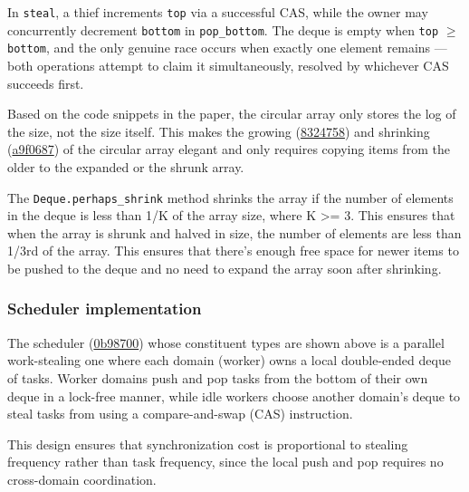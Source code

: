 \documentclass[11pt,a4paper]{article}
\begin{document}
In \texttt{steal}, a thief increments \texttt{top} via a successful CAS,
while the owner may concurrently decrement \texttt{bottom} in
\texttt{pop\_bottom}. The deque is empty when \texttt{top} $\geq$
\texttt{bottom}, and the only genuine race occurs when exactly one element
remains — both operations attempt to claim it simultaneously, resolved by
whichever CAS succeeds first.

Based on the code snippets in the \cite{chase2005dynamic} paper, the circular
array only stores the log of the size, not the size itself. This makes the growing
(\href{https://github.com/alinab/fork-cs6868_s26/commit/8324758fc3e51c064bcb5e6a216e97d5cc356c15}{8324758})
and shrinking
(\href{https://github.com/alinab/fork-cs6868_s26/commit/a9f0687fc8eb0b61dc2f059683f209be6a223649}{a9f0687})
of the circular array elegant and only requires copying items from the older to
the expanded or the shrunk array.

The \texttt{Deque.perhaps\_shrink} method shrinks the
array if the number of elements in the deque is less than 1/K of the array size,
where K >= 3. This ensures that when the array is shrunk and halved in size, the
number of elements are less than 1/3rd of the array. This ensures that there's
enough free space for newer items to be pushed to the deque and no need to
expand the array soon after shrinking.


\subsubsection{Scheduler implementation}

The scheduler (\href{https://github.com/alinab/fork-cs6868_s26/blame/work-steal/work-steal/lib/scheduler.ml}{0b98700})
whose constituent types are shown above is a parallel work-stealing
one where each domain (worker) owns a local double-ended deque of tasks. Worker domains
push and pop tasks from the bottom of their own deque in a lock-free manner,
while idle workers choose another domain's deque to steal tasks from using a
compare-and-swap (CAS) instruction.

This design ensures that synchronization cost is proportional to stealing
frequency rather than task frequency, since the local push and pop requires no
cross-domain coordination.
\end{document}
